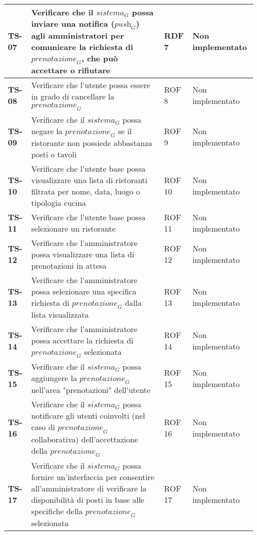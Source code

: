 \begin{longtable}{|>{\centering\arraybackslash}p{1.5cm}|p{9.8cm}|p{2cm}|p{3.5cm}|}
    \textbf{TS-07} & Verificare che il $\textit{sistema}_G$ possa inviare una notifica ($\textit{push}_G$) agli amministratori per comunicare la richiesta di $\textit{prenotazione}_G$, che può accettare o rifiutare & RDF 7 & Non implementato \\
    \hline
    \rowcolor{gray!10}
    \textbf{TS-08} & Verificare che l'utente possa essere in grado di cancellare la $\textit{prenotazione}_G$ & ROF 8 & Non implementato \\ 
    \hline
    \rowcolor{gray!10}
    \textbf{TS-09} & Verificare che il $\textit{sistema}_G$ possa negare la $\textit{prenotazione}_G$ se il ristorante non possiede abbastanza posti o tavoli & ROF 9 & Non implementato \\ 
    \hline
    \rowcolor{gray!10}
    \textbf{TS-10} & Verificare che l'utente base possa visualizzare una lista di ristoranti filtrata per nome, data, luogo o tipologia cucina & ROF 10 & Non implementato \\ 
    \hline
    \rowcolor{gray!10}
    \textbf{TS-11} & Verificare che l'utente base possa selezionare un ristorante & ROF 11 & Non implementato \\ 
    \hline
    \rowcolor{gray!10}
    \textbf{TS-12} & Verificare che l'amministratore possa visualizzare una lista di prenotazioni in attesa & ROF 12 & Non implementato \\
    \hline
    \rowcolor{gray!10}
    \textbf{TS-13} & Verificare che l'amministratore possa selezionare una specifica richiesta di $\textit{prenotazione}_G$ dalla lista visualizzata & ROF 13 & Non implementato \\ 
    \hline
    \rowcolor{gray!10}
    \textbf{TS-14} & Verificare che l'amministratore possa accettare la richiesta di $\textit{prenotazione}_G$ selezionata & ROF 14 & Non implementato \\ 
    \hline
    \rowcolor{gray!10}
    \textbf{TS-15} & Verificare che il $\textit{sistema}_G$ possa aggiungere la $\textit{prenotazione}_G$ nell'area "prenotazioni" dell'utente & ROF 15 & Non implementato \\
    \hline
    \rowcolor{gray!10}
    \textbf{TS-16} & Verificare che il $\textit{sistema}_G$ possa notificare gli utenti coinvolti (nel caso di $\textit{prenotazione}_G$ collaborativa) dell'accettazione della $\textit{prenotazione}_G$ & ROF 16 & Non implementato \\ 
    \hline
    \rowcolor{gray!10}
    \textbf{TS-17} & Verificare che il $\textit{sistema}_G$ possa fornire un'interfaccia per consentire all'amministratore di verificare la disponibilità di posti in base alle specifiche della $\textit{prenotazione}_G$ selezionata & ROF 17 & Non implementato \\ 

\end{longtable}
